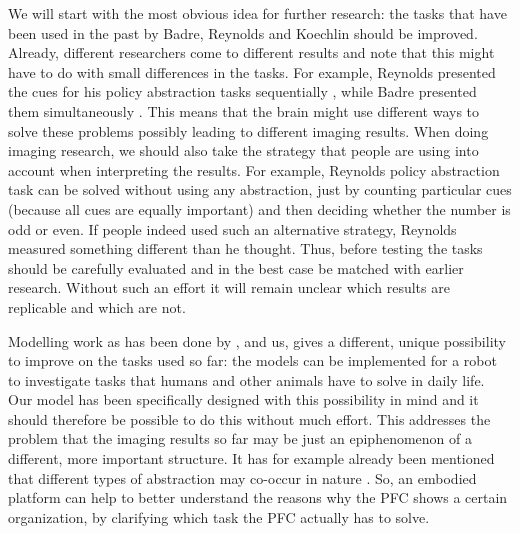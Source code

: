 \documentclass[10pt,a4paper]{report}
\begin{document}
We will start with the most obvious idea for further research: the tasks that have been used in the past by Badre, Reynolds and Koechlin should be improved. Already, different researchers come to different results and note that this might have to do with small differences in the tasks. For example, Reynolds presented the cues for his policy abstraction tasks sequentially \citep{Reynolds2012}, while Badre presented them simultaneously \citep{Badre2007}. This means that the brain might use different ways to solve these problems possibly leading to different imaging results. When doing imaging research, we should also take the strategy that people are using into account when interpreting the results. For example, Reynolds policy abstraction task can be solved without using any abstraction, just by counting particular cues (because all cues are equally important) and then deciding whether the number is odd or even. If people indeed used such an alternative strategy, Reynolds measured something different than he thought. Thus, before testing the tasks should be carefully evaluated and in the best case be matched with earlier research. Without such an effort it will remain unclear which results are replicable and which are not.

Modelling work as has been done by \citet{Botvinick2007}, \citet{O'Reilly2006} and us, gives a different, unique possibility to improve on the tasks used so far: the models can be implemented for a robot to investigate tasks that humans and other animals have to solve in daily life. Our model has been specifically designed with this possibility in mind and it should therefore be possible to do this without much effort. This addresses the problem that the imaging results so far may be just an epiphenomenon of a different, more important structure. It has for example already been mentioned that different types of abstraction may co-occur in nature \citep{Botvinick2007}. So, an embodied platform can help to better understand the reasons why the PFC shows a certain organization, by clarifying which task the PFC actually has to solve.
\end{document}
